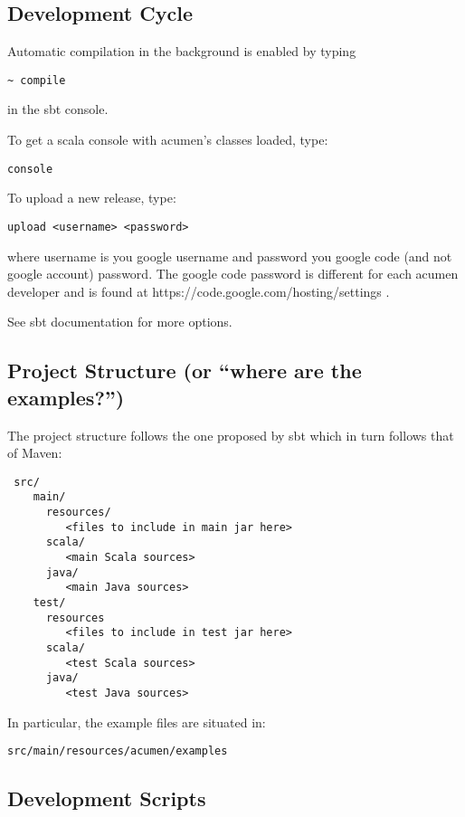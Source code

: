 \subsection{Development Cycle}

Automatic compilation in the background is enabled by typing

\begin{lstlisting}
~ compile
\end{lstlisting}
 
in the sbt console.

To get a scala console with acumen's classes loaded, type:

\begin{lstlisting}
console
\end{lstlisting}

To upload a new release, type:

\begin{lstlisting}
upload <username> <password>
\end{lstlisting}

where username is you google username and password you google code (and not google account) password. The google code password is different for each acumen developer and is found at https://code.google.com/hosting/settings .

See sbt documentation for more options.
\subsection{Project Structure (or ``where are the examples?'')}

The project structure follows the one proposed by sbt which in turn follows that of Maven:

\begin{lstlisting}
 src/
    main/
      resources/
         <files to include in main jar here>
      scala/
         <main Scala sources>
      java/
         <main Java sources>
    test/
      resources
         <files to include in test jar here>
      scala/
         <test Scala sources>
      java/
         <test Java sources>
\end{lstlisting}

In particular, the example files are situated in:

\begin{lstlisting}
src/main/resources/acumen/examples
\end{lstlisting}

\subsection{Development Scripts}

